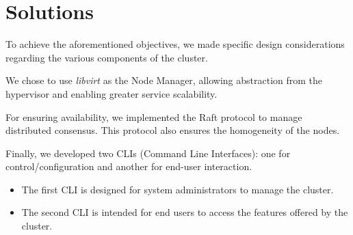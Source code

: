 \section{Solutions}
To achieve the aforementioned objectives, we made specific design considerations 
regarding the various components of the cluster.

We chose to use \textit{libvirt} as the Node Manager, allowing abstraction from the 
hypervisor and enabling greater service scalability.

For ensuring availability, we implemented the Raft protocol to manage distributed 
consensus. This protocol also ensures the homogeneity of the nodes.

Finally, we developed two CLIs (Command Line Interfaces): one for control/configuration
and another for end-user interaction.
\begin{itemize}
	\item The first CLI is designed for system administrators to manage the cluster.
	\item The second CLI is intended for end users to access the features offered by the cluster.
\end{itemize}
